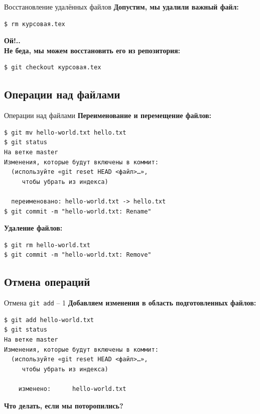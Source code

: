 \documentclass[presentation]{beamer}
\begin{document}
\begin{frame}[fragile]{Восстановление удалённых файлов}
  \Large
  \textbf{Допустим, мы удалили важный файл:}
\begin{verbatim}
$ rm курсовая.tex
\end{verbatim}
  \bigskip
  \textbf{Ой!..}\\[20pt]
  \textbf{Не беда, мы можем восстановить его из репозитория:}
\begin{verbatim}
$ git checkout курсовая.tex
\end{verbatim}
\end{frame}



\subsection{Операции над файлами}

\begin{frame}[fragile]{Операции над файлами}
  \textbf{Переименование и перемещение файлов:}
\begin{verbatim}
$ git mv hello-world.txt hello.txt
$ git status
На ветке master
Изменения, которые будут включены в коммит:
  (используйте «git reset HEAD <файл>…»,
     чтобы убрать из индекса)

  переименовано: hello-world.txt -> hello.txt
$ git commit -m "hello-world.txt: Rename"
\end{verbatim}

  \textbf{Удаление файлов:}
\begin{verbatim}
$ git rm hello-world.txt
$ git commit -m "hello-world.txt: Remove"
\end{verbatim}
\end{frame}



\subsection{Отмена операций}

\begin{frame}[fragile]{Отмена \texttt{git add} -- 1}
  \textbf{Добавляем изменения в область подготовленных файлов:}
\begin{verbatim}
$ git add hello-world.txt
$ git status
На ветке master
Изменения, которые будут включены в коммит:
  (используйте «git reset HEAD <файл>…»,
     чтобы убрать из индекса)

	изменено:      hello-world.txt
\end{verbatim}
  \textbf{Что делать, если мы поторопились?}
\end{frame}
\end{document}
